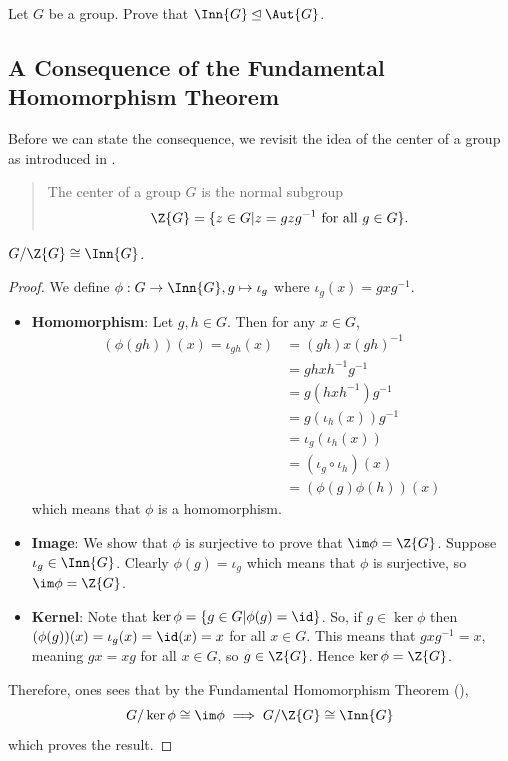 \begin{exercise}
    Let $G$ be a group. Prove that $\Inn{G} \unlhd \Aut{G}$.
\end{exercise}

\subsection{A Consequence of the Fundamental Homomorphism Theorem}
Before we can state the consequence, we revisit the idea of the center of a group as introduced in .
\begin{quote}
    The center of a group $G$ is the normal subgroup
    \[
        \Z{G} = \{z \in G \vert z = gzg^{-1} \text{ for all } g \in G\}.
    \]
\end{quote}

\begin{proposition}
    $G/\Z{G} \cong \Inn{G}$.
\end{proposition}
\begin{proof}
    We define $\phi: G \to \Inn{G}, g \mapsto \iota_g$ where $\iota_g(x) = gxg^{-1}$.
    \begin{itemize}
        \item \textbf{Homomorphism}: Let $g, h \in G$. Then for any $x \in G$,
        \begin{align*}
            (\phi(gh))(x) = \iota_{gh}(x) &= (gh)x(gh)^{-1}\\
            &= gh x h^{-1}g^{-1}\\
            &= g(hxh^{-1})g^{-1}\\
            &= g(\iota_h(x))g^{-1}\\
            &=\iota_g(\iota_h(x))\\
            &=(\iota_g\circ\iota_h)(x)\\
            &=(\phi(g)\phi(h))(x)
        \end{align*}
        which means that $\phi$ is a homomorphism.

        \item \textbf{Image}: We show that $\phi$ is surjective to prove that $\im \phi = \Z{G}$. Suppose $\iota_g \in \Inn{G}$. Clearly $\phi(g) = \iota_g$  which means that $\phi$ is surjective, so $\im\phi = \Z{G}$.

        \item \textbf{Kernel}: Note that $\ker\phi = \{g \in G \vert \phi(g) = \id\}$. So, if $g \in \ker\phi$ then $(\phi(g))(x) = \iota_g(x) = \id(x) = x$ for all $x \in G$. This means that $gxg^{-1} = x$, meaning $gx = xg$ for all $x \in G$, so $g \in \Z{G}$. Hence $\ker\phi = \Z{G}$.
    \end{itemize}
    Therefore, ones sees that by the Fundamental Homomorphism Theorem (),
    \[
        G/\ker\phi \cong \im\phi \implies G/\Z{G} \cong \Inn{G}
    \]
    which proves the result.
\end{proof}

